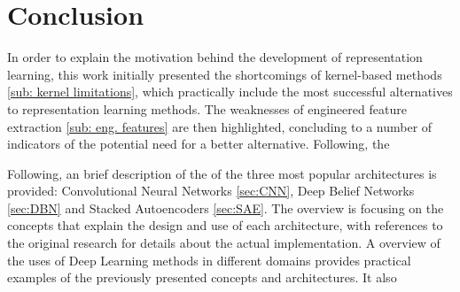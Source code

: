 \documentclass[a4paper]{article}
\begin{document}
	
\section{Conclusion}
	In order to explain the motivation behind the development of representation learning, this work initially presented the shortcomings of kernel-based methods \ref{sub: kernel limitations}, which practically include the most successful alternatives to representation learning methods. The weaknesses of engineered feature extraction \ref{sub: eng. features} are then highlighted, concluding to a number of indicators of the potential need for a better alternative. Following, the
	
	
	Following, an brief description of the of the three most popular architectures is provided: Convolutional Neural Networks \ref{sec:CNN}, Deep Belief Networks \ref{sec:DBN} and Stacked Autoencoders \ref{sec:SAE}. The overview is focusing on the concepts that explain the design and use of each architecture, with references to the original research for details about the actual implementation. 
	A overview of the uses of Deep Learning methods in different domains provides practical examples of the previously presented concepts and architectures. It also 

	
	
\end{document}
